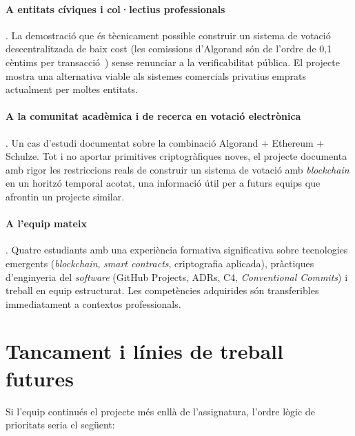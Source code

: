 \paragraph{A entitats cíviques i col·lectius professionals}.
La demostració que és tècnicament possible construir un sistema de votació descentralitzada de baix cost (les comissions
d'Algorand són de l'ordre de 0,1 cèntims per transacció~\cite{chen2017algorand}) sense renunciar a la verificabilitat
pública.
El projecte mostra una alternativa viable als sistemes comercials privatius emprats actualment per moltes entitats.

\paragraph{A la comunitat acadèmica i de recerca en votació electrònica}.
Un cas d'estudi documentat sobre la combinació Algorand + Ethereum + Schulze.
Tot i no aportar primitives criptogràfiques noves, el projecte documenta amb rigor les restriccions reals de construir
un sistema de votació amb \emph{blockchain} en un horitzó temporal acotat, una informació útil per a futurs equips que
afrontin un projecte similar.

\paragraph{A l'equip mateix}.
Quatre estudiants amb una experiència formativa significativa sobre tecnologies emergents (\emph{blockchain},
\emph{smart contracts}, criptografia aplicada), pràctiques d'enginyeria del \textit{software} (GitHub Projects,
\aclp{ADR}, C4, \emph{Conventional Commits}) i treball en equip estructurat.
Les competències adquirides són transferibles immediatament a contextos professionals.



\section{Tancament i línies de treball futures}
\label{sec:tancament}

Si l'equip continués el projecte més enllà de l'assignatura, l'ordre lògic de prioritats seria el següent:

